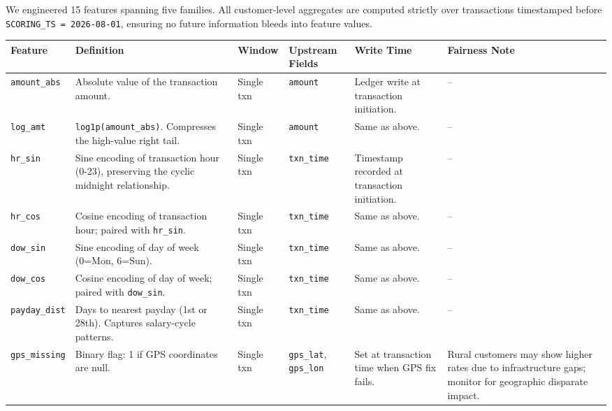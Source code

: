 \documentclass[11pt,a4paper]{article}
\begin{document}
We engineered 15 features spanning five families. All customer-level aggregates are
computed strictly over transactions timestamped before \texttt{SCORING\_TS = 2026-08-01},
ensuring no future information bleeds into feature values.

\vspace{2pt}
\begin{center}
\tiny
\setlength{\tabcolsep}{2.5pt}
\renewcommand{\arraystretch}{1.15}
\begin{tabularx}{\textwidth}{@{}P{1.6cm} P{2.4cm} P{1.7cm} P{1.8cm} P{2.4cm} P{2.3cm}@{}}
\toprule
\textbf{Feature} & \textbf{Definition} & \textbf{Window} & \textbf{Upstream Fields} & \textbf{Write Time} & \textbf{Fairness Note} \\
\midrule

\texttt{amount\_abs} & Absolute value of the transaction amount. & Single txn & \texttt{amount} & Ledger write at transaction initiation. & -- \\

\texttt{log\_amt} & \texttt{log1p(amount\_abs)}. Compresses the high-value right tail. & Single txn & \texttt{amount} & Same as above. & -- \\

\texttt{hr\_sin} & Sine encoding of transaction hour (0-23), preserving the cyclic midnight relationship. & Single txn & \texttt{txn\_time} & Timestamp recorded at transaction initiation. & -- \\

\texttt{hr\_cos} & Cosine encoding of transaction hour; paired with \texttt{hr\_sin}. & Single txn & \texttt{txn\_time} & Same as above. & -- \\

\texttt{dow\_sin} & Sine encoding of day of week (0=Mon, 6=Sun). & Single txn & \texttt{txn\_time} & Same as above. & -- \\

\texttt{dow\_cos} & Cosine encoding of day of week; paired with \texttt{dow\_sin}. & Single txn & \texttt{txn\_time} & Same as above. & -- \\

\texttt{payday\_dist} & Days to nearest payday (1st or 28th). Captures salary-cycle patterns. & Single txn & \texttt{txn\_time} & Same as above. & -- \\

\texttt{gps\_missing} & Binary flag: 1 if GPS coordinates are null. & Single txn & \texttt{gps\_lat}, \texttt{gps\_lon} & Set at transaction time when GPS fix fails. & Rural customers may show higher rates due to infrastructure gaps; monitor for geographic disparate impact. \\


\end{tabularx}
\end{center}
\end{document}
